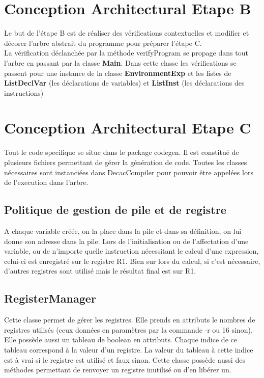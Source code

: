 \documentclass[12pt, a4paper, one side]{article}
\begin{document}
    \section{Conception Architectural Etape B}
    Le but de l'étape B est de réaliser des vérifications contextuelles et modifier et décorer l'arbre abstrait du programme pour préparer l'étape C.
    \\
    La vérification déclanchée par la méthode verifyProgram se propage dans tout l'arbre en passant par la classe \textbf{Main}. Dans cette classe les vérifications se passent pour une instance de la classe \textbf{EnvironmentExp} et les listes de \textbf{ListDeclVar} (les déclarations de variables) et \textbf{ListInst} (les déclarations des instructions)

    \section{Conception Architectural Etape C}

    Tout le code specifique se situe dans le package codegen. Il est constitué de plusieurs fichiers
    permettant de gérer la génération de code. Toutes les classes nécessaires sont instanciées dans DecacCompiler
    pour pouvoir être appelées lors de l'execution dans l'arbre.

    \subsection{Politique de gestion de pile et de registre}

    A chaque variable créée, on la place dans la pile et dans sa définition, on lui donne son adresse dans la pile.
    Lors de l'initialisation ou de l'affectation d'une variable, ou de n'importe quelle instruction nécessitant le
    calcul d'une expression, celui-ci est enregistré sur le registre R1. Bien sur lors du calcul, si c'est nécessaire,
    d'autres registres sont utilisé mais le résultat final est sur R1.

    \subsection{RegisterManager}

    Cette classe permet de gérer les registres. Elle prends en attributs le nombres de registres utilisés
    (ceux données en paramètres par la commande -r ou 16 sinon). Elle possède aussi un tableau de boolean
    en attributs. Chaque indice de ce tableau correspond à la valeur d'un registre. La valeur du tableau
    à cette indice est à vrai si le registre est utilisé et faux sinon. Cette classe possède aussi des
    méthodes permettant de renvoyer un registre inutilisé ou d'en libérer un.
\end{document}
